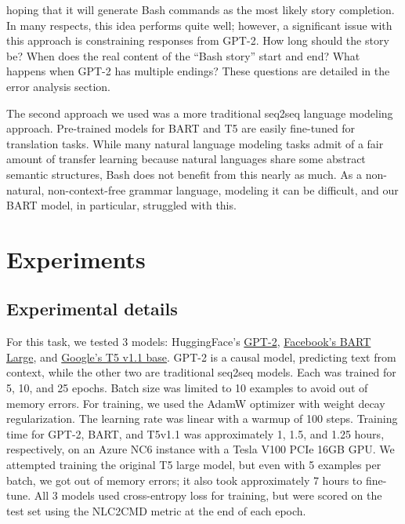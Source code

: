 \documentclass{article}
\begin{document}
hoping that it will generate Bash commands as the most likely story completion.
In many respects, this idea performs quite well; however, a significant issue
with this approach is constraining responses from GPT-2. How long should the
story be? When does the real content of the ``Bash story'' start and end? What
happens when GPT-2 has multiple endings? These questions are detailed in the
error analysis section.
\par
The second approach we used was a more traditional seq2seq language modeling
approach. Pre-trained models for BART and T5 are easily fine-tuned for
translation tasks. While many natural language modeling tasks admit of a fair
amount of transfer learning because natural languages share some abstract
semantic structures, Bash does not benefit from this nearly as much. As a
non-natural, non-context-free grammar language, modeling it can be difficult,
and our BART model, in particular, struggled with this.

\section{Experiments}


\subsection{Experimental details}
For this task, we tested 3 models: HuggingFace's
\href{https://huggingface.co/GPT-2}{GPT-2}\cite{GPT-2},
\href{https://huggingface.co/facebook/bart-large}{Facebook's BART
	Large}\cite{bart}, and \href{https://huggingface.co/google/t5-v1_1-base}{Google's T5 v1.1
  base}. GPT-2 is a causal model, predicting text from context, while the other
  two are traditional seq2seq models. Each was trained for 5, 10, and 25
  epochs. Batch size was limited to 10 examples to avoid out of memory errors.
  For training, we used the AdamW optimizer with weight decay regularization.
  The learning rate was linear with a warmup of 100 steps. Training time for
  GPT-2, BART, and T5v1.1 was approximately 1, 1.5, and 1.25 hours,
  respectively, on an Azure NC6 instance with a Tesla V100 PCIe 16GB GPU. We
  attempted training the original T5 large model, but even with 5 examples per
  batch, we got out of memory errors; it also took approximately 7 hours to
  fine-tune. All 3 models used cross-entropy loss for training, but were scored
  on the test set using the NLC2CMD metric at the end of each epoch.
\end{document}
